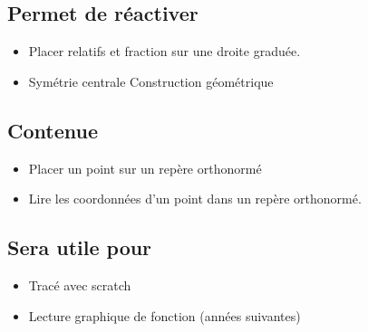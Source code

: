 

\subsection{Permet de réactiver}
\begin{itemize}
    \item Placer relatifs et fraction sur une droite graduée.
    \item Symétrie centrale
    Construction géométrique
\end{itemize}

\subsection{Contenue}
\begin{itemize}
    \item Placer un point sur un repère orthonormé
    \item Lire les coordonnées d'un point dans un repère orthonormé.
\end{itemize}

\subsection{Sera utile pour}
\begin{itemize}
    \item Tracé avec scratch
    \item Lecture graphique de fonction (années suivantes)
\end{itemize}